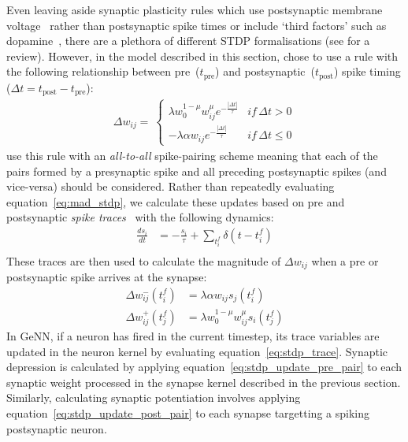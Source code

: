 \documentclass[utf8]{frontiersSCNS} %
\begin{document}
Even leaving aside synaptic plasticity rules which use postsynaptic membrane voltage~\citep{Brader2007,Clopath2010c} rather than postsynaptic spike times or include `third factors' such as dopamine~\citep{Izhikevich2007}, there are a plethora of different STDP formalisations (see \citet{Morrison2008} for a review).
However, in the model described in this section, \citet{Morrison2007} chose to use a rule with the following relationship between pre~($t_{\text{pre}}$) and postsynaptic~($t_{\text{post}}$) spike timing ($\Delta t = t_{\text{post}} - t_{\text{pre}}$):
%
\begin{align}
    \Delta w_{ij} = \
        \begin{cases}
            \lambda w_{0}^{1-\mu} w_{ij}^{\mu} e^{-\frac{|\Delta t|}{\tau}} & if\, \Delta t>0\\
            -\lambda \alpha w_{ij} e^{-\frac{|\Delta t|}{\tau}}             & if\, \Delta t\leq0
        \end{cases}\label{eq:mad_stdp}
\end{align}
%
\citet{Morrison2007} use this rule with an \textit{all-to-all} spike-pairing scheme meaning that each of the pairs formed by a presynaptic spike and all preceding postsynaptic spikes (and vice-versa) should be considered.
Rather than repeatedly evaluating equation~\ref{eq:mad_stdp}, we calculate these updates based on pre and postsynaptic \textit{spike traces}~\citep{Song2000, Morrison2007} with the following dynamics:
%
\begin{align}
    \frac{ds_{i}}{dt} & = -\frac{s_{i}}{\tau} + \sum_{t_{i}^{f}}\delta(t - t_{i}^{f}) \label{eq:stdp_trace}\\
\end{align}
%
These traces are then used to calculate the magnitude of $\Delta w_{ij}$ when a pre or postsynaptic spike arrives at the synapse:
%
\begin{align}
  \Delta w_{ij}^{-}(t_{i}^{f}) & = \lambda \alpha w_{ij} s_{j}(t_{i}^{f})\label{eq:stdp_update_pre_pair}\\
  \Delta w_{ij}^{+}(t_{j}^{f}) & = \lambda w_{0}^{1-\mu} w_{ij}^{\mu} s_{i}(t_{j}^{f})\label{eq:stdp_update_post_pair}
\end{align}
%
In GeNN, if a neuron has fired in the current timestep, its trace variables are updated in the neuron kernel by evaluating equation~\ref{eq:stdp_trace}.
Synaptic depression is calculated by applying equation~\ref{eq:stdp_update_pre_pair} to each synaptic weight processed in the synapse kernel described in the previous section.
Similarly, calculating synaptic potentiation involves applying equation~\ref{eq:stdp_update_post_pair} to each synapse targetting a spiking postsynaptic neuron.
\end{document}
